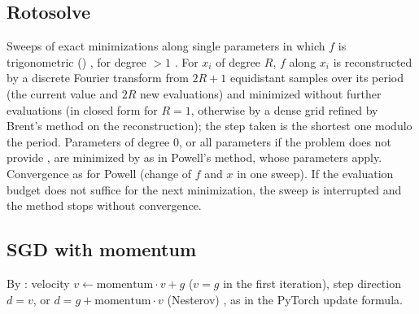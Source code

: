 \subsection{Rotosolve}

Sweeps of exact minimizations along single parameters in which $f$ is trigonometric ()
\cite{optimize:ostaszewski2021,optimize:nakanishi2020}, for degree $>1$ \cite{optimize:wierichs2022}. For $x_i$ of degree $R$,
$f$ along $x_i$ is reconstructed by a discrete Fourier transform from $2R+1$ equidistant samples over its period (the current
value and $2R$ new evaluations) and minimized without further evaluations (in closed form for $R=1$, otherwise by a dense grid
refined by Brent's method on the reconstruction); the step taken is the shortest one modulo the period. Parameters of degree 0,
or all parameters if the problem does not provide , are minimized by  as in Powell's
method, whose parameters apply. Convergence as for Powell (change of $f$ and $x$ in one sweep). If the evaluation budget does
not suffice for the next minimization, the sweep is interrupted and the method stops without convergence.
\begin{lareference}
\end{lareference}

\subsection{SGD with momentum}

By : velocity $v\leftarrow\mathrm{momentum}\cdot v+g$ ($v=g$ in the first iteration), step direction
$d=v$, or $d=g+\mathrm{momentum}\cdot v$ (Nesterov) \cite{optimize:sutskever2013}, as in the PyTorch update formula.
\begin{lareference}
\end{lareference}


